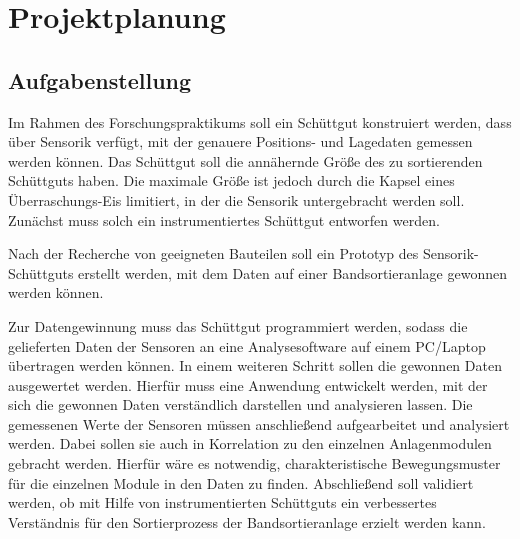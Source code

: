 \section{Projektplanung}

\subsection{Aufgabenstellung}

Im Rahmen des Forschungspraktikums soll ein Schüttgut konstruiert werden, dass über Sensorik verfügt, mit der genauere Positions- und Lagedaten gemessen werden können. Das Schüttgut soll die annähernde Größe des zu sortierenden Schüttguts haben. Die maximale Größe ist jedoch durch die Kapsel eines Überraschungs-Eis limitiert, in der die Sensorik untergebracht werden soll. Zunächst muss solch ein instrumentiertes Schüttgut entworfen werden.
 
Nach der Recherche von geeigneten Bauteilen soll ein Prototyp des Sensorik-Schüttguts erstellt werden, mit dem Daten auf einer Bandsortieranlage gewonnen werden können.

Zur Datengewinnung muss das Schüttgut programmiert werden, sodass die gelieferten Daten der Sensoren an eine Analysesoftware auf einem  PC/Laptop übertragen werden können. In einem weiteren Schritt sollen die gewonnen Daten ausgewertet werden. Hierfür muss eine Anwendung entwickelt werden, mit der sich die gewonnen Daten verständlich darstellen und analysieren lassen. Die gemessenen Werte der Sensoren müssen anschließend aufgearbeitet und analysiert werden. Dabei sollen sie auch in Korrelation zu den einzelnen Anlagenmodulen gebracht werden. Hierfür wäre es notwendig, charakteristische Bewegungsmuster für die einzelnen Module in den Daten zu finden. 
Abschließend soll validiert werden, ob mit Hilfe von instrumentierten Schüttguts ein verbessertes Verständnis für den Sortierprozess der Bandsortieranlage erzielt werden kann.

